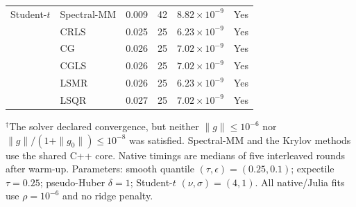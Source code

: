 \begin{table}[htbp]
\begin{tabular}{llrrrc}
Student-$t$
& Spectral-MM & 0.009 & 42 & $8.82\times10^{-9}$ & Yes \\
& CRLS & 0.025 & 25 & $6.23\times10^{-9}$ & Yes \\
& CG & 0.026 & 25 & $7.02\times10^{-9}$ & Yes \\
& CGLS & 0.026 & 25 & $7.02\times10^{-9}$ & Yes \\
& LSMR & 0.026 & 25 & $6.23\times10^{-9}$ & Yes \\
& LSQR & 0.027 & 25 & $7.02\times10^{-9}$ & Yes \\

\bottomrule
\end{tabular}
\par\smallskip
\begin{minipage}{\linewidth}
\footnotesize
$^{\dagger}$The solver declared convergence, but neither $\|g\|\leq 10^{-6}$ nor
$\|g\|/(1+\|g_0\|)\leq 10^{-8}$ was satisfied.
Spectral-MM and the Krylov methods use the shared C++ core.
Native timings are medians of five interleaved rounds after warm-up.
Parameters: smooth quantile $(\tau,\epsilon)=(0.25,0.1)$; expectile $\tau=0.25$;
pseudo-Huber $\delta=1$; Student-$t$ $(\nu,\sigma)=(4,1)$.
All native/Julia fits use $\rho=10^{-6}$ and no ridge penalty.
\end{minipage}
\end{table}

